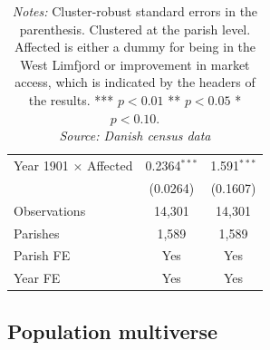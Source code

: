 \begin{table}[H]
\begin{tabular}{lcc}
   Year 1901 $\times$ Affected                       & 0.2364$^{***}$  & 1.591$^{***}$\\   
                                                     & (0.0264)        & (0.1607)\\  
   \midrule
   Observations                                     & 14,301          & 14,301\\
   Parishes                                         & 1,589           & 1,589\\
   \midrule 
   Parish FE                                        & Yes             & Yes\\  
   Year FE                                          & Yes             & Yes\\
   \midrule \midrule
\end{tabular}
\parbox{0.9\textwidth}{
\caption*{\textit{Notes:} Cluster-robust standard errors in the parenthesis. Clustered at the parish level. Affected is either a dummy for being in the West Limfjord or improvement in market access, which is indicated by the headers of the results. *** $p< 0.01$ ** $p< 0.05$ * $p< 0.10$. \\ \textit{Source: Danish census data}}
}
\end{table}


\FloatBarrier
\subsection{Population multiverse} \label{pop_multiverse} 
\FloatBarrier

